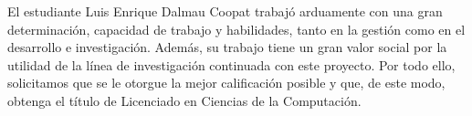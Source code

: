 \begin{opinion}
El estudiante Luis Enrique Dalmau Coopat trabajó arduamente con una gran determinación, capacidad de trabajo y habilidades, tanto en la gestión como en el desarrollo e investigación. Además, su trabajo tiene un gran valor social por la utilidad de la línea de investigación continuada con este proyecto. Por todo ello, solicitamos que se le otorgue la mejor calificación posible y que, de este modo, obtenga el título de Licenciado en Ciencias de la Computación.\\

    \begingroup
  \centering
  \hspace{1cm}
  \par
\endgroup
\end{opinion}